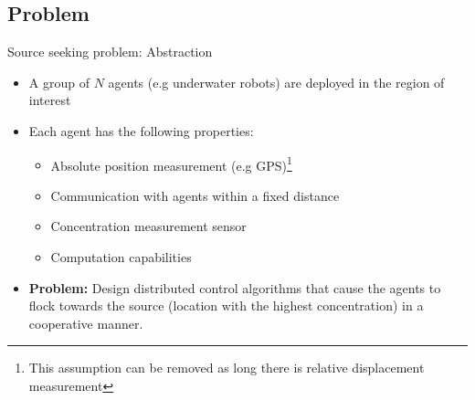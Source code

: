 \subsection{Problem}
\begin{frame}{Source seeking problem: Abstraction}
	
\begin{itemize}
	\item A group of $N$ agents (e.g underwater robots) are deployed in the region of interest
	\item Each agent has the following properties:
	    \begin{itemize}
	        \item Absolute position measurement (e.g GPS)\footnote{This assumption can be removed as long there is relative displacement measurement}
	        \item Communication with agents within a fixed distance
	        \item Concentration measurement sensor
	        \item Computation capabilities 
	    \end{itemize}
	\item \textbf{Problem:} Design distributed control algorithms that cause the agents to flock towards the source (location with the highest concentration) in a cooperative manner.
\end{itemize}
\end{frame}